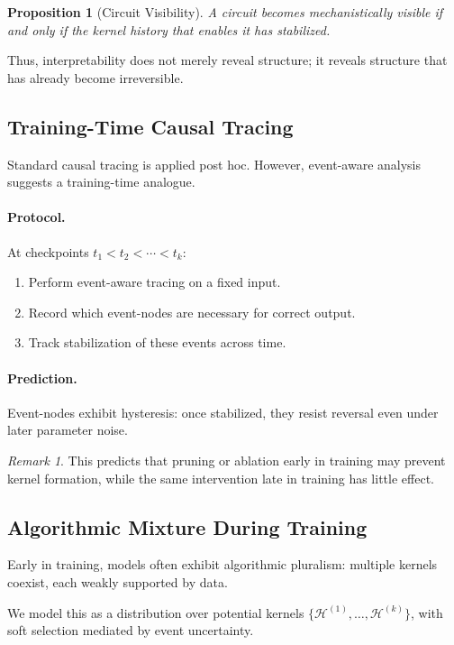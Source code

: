 \documentclass[11pt]{article}
\newtheorem{proposition}{Proposition}
\theoremstyle{remark}
\newtheorem{remark}{Remark}
\newcommand{\Hist}{\mathcal{H}}
\begin{document}
\begin{proposition}[Circuit Visibility]
A circuit becomes mechanistically visible if and only if the kernel
history that enables it has stabilized.
\end{proposition}

Thus, interpretability does not merely reveal structure; it reveals
structure that has already become irreversible.

\subsection{Training-Time Causal Tracing}

Standard causal tracing is applied post hoc. However, event-aware
analysis suggests a training-time analogue.

\paragraph{Protocol.}
At checkpoints $t_1 < t_2 < \cdots < t_k$:
\begin{enumerate}
\item Perform event-aware tracing on a fixed input.
\item Record which event-nodes are necessary for correct output.
\item Track stabilization of these events across time.
\end{enumerate}

\paragraph{Prediction.}
Event-nodes exhibit hysteresis: once stabilized, they resist reversal
even under later parameter noise.

\begin{remark}
This predicts that pruning or ablation early in training may prevent
kernel formation, while the same intervention late in training has
little effect.
\end{remark}

\subsection{Algorithmic Mixture During Training}

Early in training, models often exhibit algorithmic pluralism: multiple
kernels coexist, each weakly supported by data.

We model this as a distribution over potential kernels
$\{\Hist^{(1)}, \ldots, \Hist^{(k)}\}$, with soft selection mediated by
event uncertainty.
\end{document}
